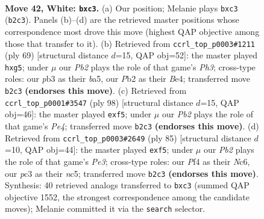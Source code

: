 \documentclass[11pt]{article}
\begin{document}
\clearpage

\begin{figure}[p]\centering
\begin{subfigure}{0.46\textwidth}\centering
\resizebox{\linewidth}{!}{%
\newchessgame
\chessboard[
  setfen={6k1/3N4/8/8/2p1pP2/1pp5/1P6/K7 w - - 0 42},
  showmover=false,
  pgfstyle=straightmove, color=movearrow, markmove={b2-c3}
]}
\caption{}
\end{subfigure}\hfill
\begin{subfigure}{0.46\textwidth}\centering
\resizebox{\linewidth}{!}{%
\newchessgame
\chessboard[
  setfen={8/4k3/7p/Bp3PP1/4b1P1/6K1/8/8 b - - 0 35},
  showmover=false,
  pgfstyle=straightmove, color=movearrow, markmove={h6-g5}
]}
\caption{}
\end{subfigure}
\\[4pt]
\begin{subfigure}{0.46\textwidth}\centering
\resizebox{\linewidth}{!}{%
\newchessgame
\chessboard[
  setfen={4k3/1n6/p4pp1/5p2/P2KP3/6BP/8/8 w - - 0 50},
  showmover=false,
  pgfstyle=straightmove, color=movearrow, markmove={e4-f5}
]}
\caption{}
\end{subfigure}\hfill
\begin{subfigure}{0.46\textwidth}\centering
\resizebox{\linewidth}{!}{%
\newchessgame
\chessboard[
  setfen={8/5k2/2n1p3/2N2Pp1/8/6PP/5K2/8 b - - 0 43},
  showmover=false,
  pgfstyle=straightmove, color=movearrow, markmove={e6-f5}
]}
\caption{}
\end{subfigure}
\caption{\textbf{Move 42, White: \texttt{bxc3}.} (a) Our position; Melanie plays \texttt{bxc3} (\texttt{b2c3}). Panels (b)--(d) are the retrieved master positions whose correspondence most drove this move (highest QAP objective among those that transfer to it). (b) Retrieved from \texttt{ccrl\_top\_p0003\#1211} (ply 69) [structural distance $d$=15, QAP obj=52]: the master played \texttt{hxg5}; under $\mu$ our \emph{Pb2} plays the role of that game's \emph{Ph3}; cross-type roles: our \emph{p}b3 as their \emph{b}a5, our \emph{P}b2 as their \emph{B}e4; transferred move \texttt{b2c3} \textbf{(endorses this move)}. (c) Retrieved from \texttt{ccrl\_top\_p0001\#3547} (ply 98) [structural distance $d$=15, QAP obj=46]: the master played \texttt{exf5}; under $\mu$ our \emph{Pb2} plays the role of that game's \emph{Pe4}; transferred move \texttt{b2c3} \textbf{(endorses this move)}. (d) Retrieved from \texttt{ccrl\_top\_p0003\#2649} (ply 85) [structural distance $d$=10, QAP obj=44]: the master played \texttt{exf5}; under $\mu$ our \emph{Pb2} plays the role of that game's \emph{Pe3}; cross-type roles: our \emph{P}f4 as their \emph{N}c6, our \emph{p}c3 as their \emph{n}c5; transferred move \texttt{b2c3} \textbf{(endorses this move)}. Synthesis: 40 retrieved analogs transferred to \texttt{bxc3} (summed QAP objective 1552, the strongest correspondence among the candidate moves); Melanie committed it via the \texttt{search} selector.}
\label{fig:thought-m82}
\end{figure}
\end{document}

